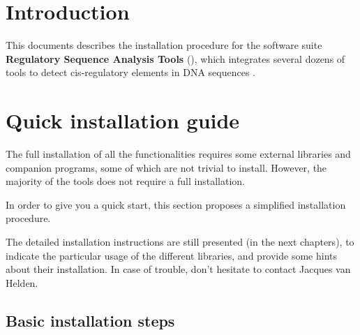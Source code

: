 \documentclass[12pt,a4paper, oneside]{scrreprt} %
\begin{document}


\newpage
\tableofcontents
\newpage

\chapter{Introduction}

This documents describes the installation procedure for the software
suite \textbf{Regulatory Sequence Analysis Tools} (\RSAT), which
integrates several dozens of tools to detect cis-regulatory elements
in DNA sequences
\cite{Thomas-Chollier:2011:W86-91,Thomas-Chollier:2008:W119-27,vanHelden:2003:3593-6,vanHelden:2000:177-87}.

\chapter{Quick installation guide}

The full installation of all the \RSAT functionalities requires some
external libraries and companion programs, some of which are not
trivial to install. However, the majority of the tools does not
require a full installation. 

In order to give you a quick start, this section proposes a simplified
installation procedure.

The detailed installation instructions are still presented (in the
next chapters), to indicate the particular usage of the different
libraries, and provide some hints about their installation. In case of
trouble, don't hesitate to contact Jacques van Helden.

\section{Basic installation steps}
\end{document}
